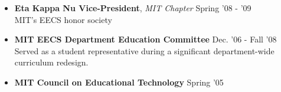 \documentclass[margin]{res}
\begin{document}
\begin{resume}
\begin{itemize}[leftmargin=*]
                \item {\bf Eta Kappa Nu Vice-President}, {\it MIT Chapter} \hfill Spring '08 - '09 \\ MIT's EECS honor society 


\item {\bf MIT EECS Department Education Committee} \hfill Dec. '06 - Fall '08 \\
Served as a student representative during a significant department-wide curriculum redesign.
\item {\bf MIT Council on Educational Technology} \hfill Spring '05 


 \end{itemize}
		 


          

		
		 


 
 
 


 
%		 
		
 
		

		 


\end{resume}
\end{document}
